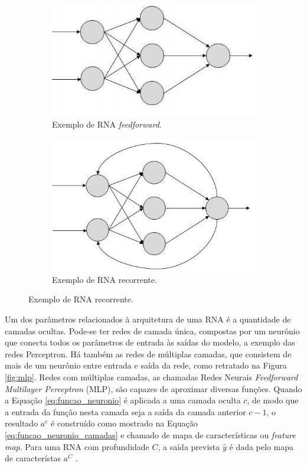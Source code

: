 \begin{figure}[h!]
	\caption{Exemplos de RNA com diferentes tipos de conexões entre neurônios \cite{rna:feedback}.}
	\label{fig:rna_conectividade}
	\begin{subfigure}[h]{0.35\linewidth}
		\caption{Exemplo de RNA \emph{feedforward}.}
		\label{fig:feedforward}
		\includegraphics[width=\linewidth]{img/feedforward.jpg}
	\end{subfigure}
	\hfill
	\begin{subfigure}[h]{0.35\linewidth}
		\caption{Exemplo de RNA recorrente.}
		\label{fig:recorrente}
		\includegraphics[width=\linewidth]{img/recorrente2}
	\end{subfigure}%
\end{figure}

Um dos parâmetros relacionados à arquitetura de uma RNA é a quantidade de camadas ocultas. Pode-se ter redes de camada única, compostas por um neurônio que conecta todos os parâmetros de entrada às saídas do modelo, a exemplo das redes Perceptron. Há também as redes de múltiplas camadas, que consistem de mais de um neurônio entre entrada e saída da rede, como retratado na Figura \ref{fig:mlp}. Redes com múltiplas camadas, as chamadas Redes Neurais \emph{Feedforward Multilayer Perceptron} (MLP), são capazes de aproximar diversas funções. Quando a Equação \ref{eq:funcao_neuronio} é aplicada a uma camada oculta $c$, de modo que a entrada da função nesta camada seja a saída da camada anterior $c-1$, o resultado $a^{c}$ é construído como mostrado na Equação \ref{eq:funcao_neuronio_camadas} e chamado de mapa de características ou \emph{feature map}. Para uma RNA com profundidade $C$, a saída prevista $\hat{y}$
é dada pelo mapa de característas $a^C$ \cite{hornik1991approximation,Teresa:Livro}.

